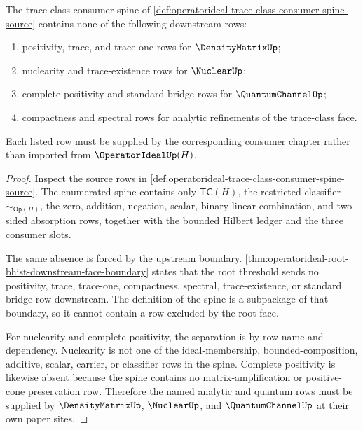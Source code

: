 \begin{theorem}
\label{thm:operatorideal-trace-class-consumer-row-separation}
The trace-class consumer spine of \autoref{def:operatorideal-trace-class-consumer-spine-source} contains none of the following downstream rows:
\begin{enumerate}
\item positivity, trace, and trace-one rows for $\DensityMatrixUp$;
\item nuclearity and trace-existence rows for $\NuclearUp$;
\item complete-positivity and standard bridge rows for $\QuantumChannelUp$;
\item compactness and spectral rows for analytic refinements of the trace-class face.
\end{enumerate}
Each listed row must be supplied by the corresponding consumer chapter rather than imported from $\OperatorIdealUp(H)$.
\end{theorem}
\begin{proof}
Inspect the source rows in \autoref{def:operatorideal-trace-class-consumer-spine-source}. The enumerated spine contains only $\mathsf{TC}(H)$, the restricted classifier $\sim_{\mathsf{Op}(H)}$, the zero, addition, negation, scalar, binary linear-combination, and two-sided absorption rows, together with the bounded Hilbert ledger and the three consumer slots.

The same absence is forced by the upstream boundary. \autoref{thm:operatorideal-root-bhist-downstream-face-boundary} states that the root threshold sends no positivity, trace, trace-one, compactness, spectral, trace-existence, or standard bridge row downstream. The definition of the spine is a subpackage of that boundary, so it cannot contain a row excluded by the root face.

For nuclearity and complete positivity, the separation is by row name and dependency. Nuclearity is not one of the ideal-membership, bounded-composition, additive, scalar, carrier, or classifier rows in the spine. Complete positivity is likewise absent because the spine contains no matrix-amplification or positive-cone preservation row. Therefore the named analytic and quantum rows must be supplied by $\DensityMatrixUp$, $\NuclearUp$, and $\QuantumChannelUp$ at their own paper sites.
\end{proof}

